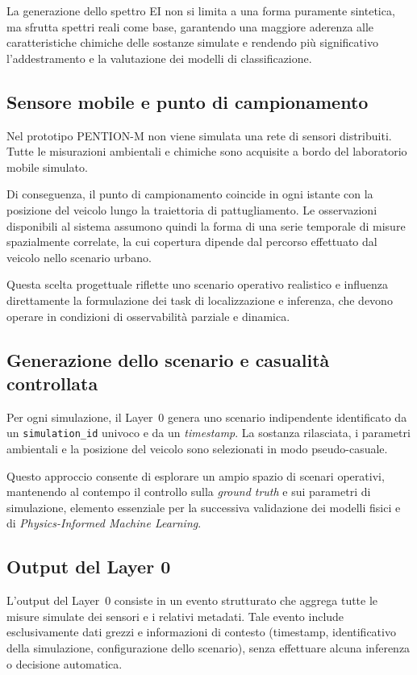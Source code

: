 La generazione dello spettro EI non si limita a una forma puramente sintetica, ma sfrutta spettri reali come base, garantendo una maggiore aderenza alle caratteristiche chimiche delle sostanze simulate e rendendo più significativo l’addestramento e la valutazione dei modelli di classificazione.

\subsection*{Sensore mobile e punto di campionamento}

Nel prototipo \textsc{PENTION-M} non viene simulata una rete di sensori distribuiti.
Tutte le misurazioni ambientali e chimiche sono acquisite a bordo del laboratorio mobile simulato.

Di conseguenza, il punto di campionamento coincide in ogni istante con la posizione del veicolo lungo la traiettoria di pattugliamento.
Le osservazioni disponibili al sistema assumono quindi la forma di una serie temporale di misure spazialmente correlate, la cui copertura dipende dal percorso effettuato dal veicolo nello scenario urbano.

Questa scelta progettuale riflette uno scenario operativo realistico e influenza direttamente la formulazione dei task di localizzazione e inferenza, che devono operare in condizioni di osservabilità parziale e dinamica.

\subsection*{Generazione dello scenario e casualità controllata}

Per ogni simulazione, il Layer~0 genera uno scenario indipendente identificato da un \texttt{simulation\_id} univoco e da un \textit{timestamp}.
La sostanza rilasciata, i parametri ambientali e la posizione del veicolo sono selezionati in modo pseudo-casuale.

Questo approccio consente di esplorare un ampio spazio di scenari operativi, mantenendo al contempo il controllo sulla \emph{ground truth} e sui parametri di simulazione, elemento essenziale per la successiva validazione dei modelli fisici e di \emph{Physics-Informed Machine Learning}.

\subsection*{Output del Layer 0}

L’output del Layer~0 consiste in un evento strutturato che aggrega tutte le misure simulate dei sensori e i relativi metadati.
Tale evento include esclusivamente dati grezzi e informazioni di contesto (timestamp, identificativo della simulazione, configurazione dello scenario), senza effettuare alcuna inferenza o decisione automatica.

